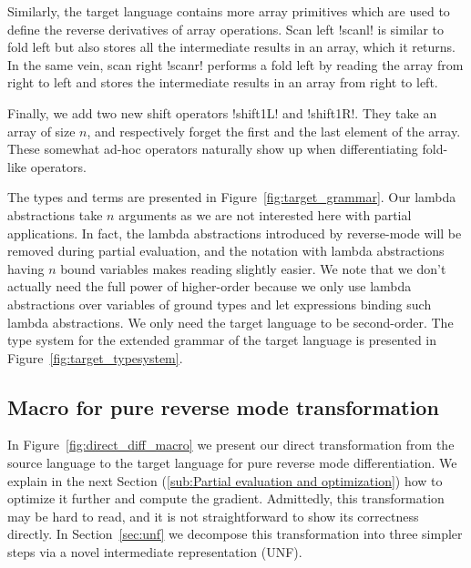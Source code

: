 Similarly, the target language contains more array primitives which are used to define the reverse derivatives of array operations. 
Scan left !scanl! is similar to fold left but also stores all the intermediate results in an array, which it returns.
In the same vein, scan right !scanr! performs a fold left by reading the array from right to left and stores 
the intermediate results in an array from right to left.

Finally, we add two new shift operators !shift1L! and !shift1R!. 
They take an array of size $n$, and respectively forget the first and the last element of the array.
These somewhat ad-hoc operators naturally show up when differentiating fold-like operators.

The types and terms are presented in Figure~\ref{fig:target_grammar}.
Our lambda abstractions take $n$ arguments as we are not interested here with partial applications. 
In fact, the lambda abstractions introduced by reverse-mode will be removed during partial evaluation, 
and the notation with lambda abstractions having $n$ bound variables makes reading slightly easier.
We note that we don't actually need the full power of higher-order because we only use lambda abstractions over variables of ground types
and let expressions binding such lambda abstractions. We only need the target language to be second-order.
The type system for the extended grammar of the target language is presented in Figure~\ref{fig:target_typesystem}. 





\subsection{Macro for pure reverse mode transformation} %
\label{sub:Macro for pure reverse mode transformation}

In Figure~\ref{fig:direct_diff_macro} we present our direct transformation from the source language to the target language for pure reverse mode differentiation.
We explain in the next Section (\ref{sub:Partial evaluation and optimization}) how to optimize it further and compute the gradient.
Admittedly, this transformation may be hard to read, and it is not straightforward to show its correctness directly. 
In Section~\ref{sec:unf} we decompose this transformation into three simpler steps via a novel intermediate representation (UNF).

